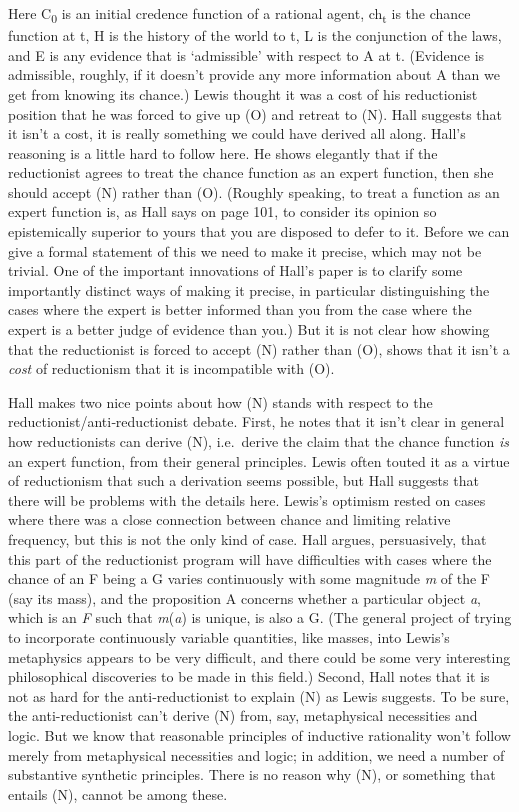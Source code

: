 \documentclass[
  11pt,
  letterpaper,
  DIV=11,
  numbers=noendperiod,
  twoside]{scrartcl}
\begin{document}
Here C\textsubscript{0} is an initial credence function of a rational
agent, ch\textsubscript{t} is the chance function at t, H is the history
of the world to t, L is the conjunction of the laws, and E is any
evidence that is `admissible' with respect to A at t. (Evidence is
admissible, roughly, if it doesn't provide any more information about A
than we get from knowing its chance.) Lewis thought it was a cost of his
reductionist position that he was forced to give up (O) and retreat to
(N). Hall suggests that it isn't a cost, it is really something we could
have derived all along. Hall's reasoning is a little hard to follow
here. He shows elegantly that if the reductionist agrees to treat the
chance function as an expert function, then she should accept (N) rather
than (O). (Roughly speaking, to treat a function as an expert function
is, as Hall says on page 101, to consider its opinion so epistemically
superior to yours that you are disposed to defer to it. Before we can
give a formal statement of this we need to make it precise, which may
not be trivial. One of the important innovations of Hall's paper is to
clarify some importantly distinct ways of making it precise, in
particular distinguishing the cases where the expert is better informed
than you from the case where the expert is a better judge of evidence
than you.) But it is not clear how showing that the reductionist is
forced to accept (N) rather than (O), shows that it isn't a \emph{cost}
of reductionism that it is incompatible with (O).

Hall makes two nice points about how (N) stands with respect to the
reductionist/anti‑reductionist debate. First, he notes that it isn't
clear in general how reductionists can derive (N), i.e.~derive the claim
that the chance function \emph{is} an expert function, from their
general principles. Lewis often touted it as a virtue of reductionism
that such a derivation seems possible, but Hall suggests that there will
be problems with the details here. Lewis's optimism rested on cases
where there was a close connection between chance and limiting relative
frequency, but this is not the only kind of case. Hall argues,
persuasively, that this part of the reductionist program will have
difficulties with cases where the chance of an F being a G varies
continuously with some magnitude \emph{m} of the F (say its mass), and
the proposition A concerns whether a particular object \emph{a}, which
is an \emph{F} such that \emph{m}(\emph{a}) is unique, is also a G. (The
general project of trying to incorporate continuously variable
quantities, like masses, into Lewis's metaphysics appears to be very
difficult, and there could be some very interesting philosophical
discoveries to be made in this field.) Second, Hall notes that it is not
as hard for the anti‑reductionist to explain (N) as Lewis suggests. To
be sure, the anti-reductionist can't derive (N) from, say, metaphysical
necessities and logic. But we know that reasonable principles of
inductive rationality won't follow merely from metaphysical necessities
and logic; in addition, we need a number of substantive synthetic
principles. There is no reason why (N), or something that entails (N),
cannot be among these.
\end{document}
